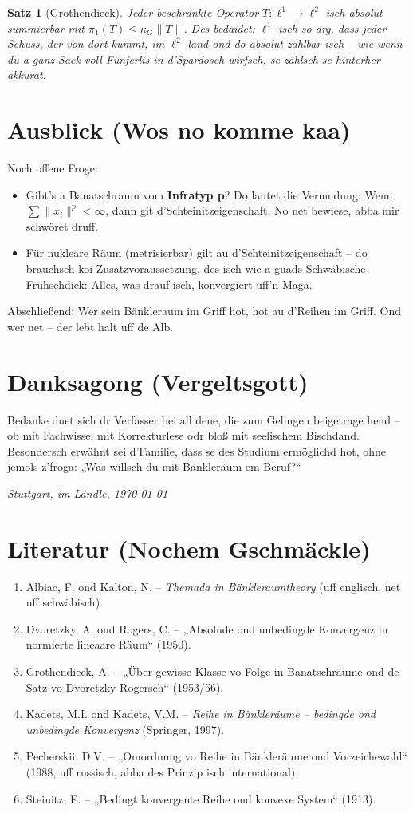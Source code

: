 \documentclass[12pt,a4paper]{scrbook}
\newtheorem{theorem}{Satz}[chapter]
\begin{document}
	\begin{theorem}[Grothendieck]
		Jeder beschränkte Operator \(T: \ell^1 \to \ell^2\) isch absolut summierbar mit \(\pi_1(T) \le \kappa_G \|T\|\). Des bedaidet: \(\ell^1\) isch so arg, dass jeder Schuss, der von dort kummt, im \(\ell^2\) land ond do absolut zählbar isch – wie wenn du a ganz Sack voll Fünferlis in d’Spardosch wirfsch, se zählsch se hinterher akkurat.
	\end{theorem}
	
	\chapter{Ausblick (Wos no komme kaa)}
	Noch offene Froge:
	\begin{itemize}
		\item Gibt’s a Banatschraum vom \textbf{Infratyp p}? Do lautet die Vermudung: Wenn \(\sum\|x_i\|^p < \infty\), dann git d’Schteinitzeigenschaft. No net bewiese, abba mir schwöret druff.
		\item Für nukleare Räum (metrisierbar) gilt au d’Schteinitzeigenschaft – do brauchsch koi Zusatzvoraussetzung, des isch wie a guads Schwäbische Frühschdick: Alles, was drauf isch, konvergiert uff’n Maga.
	\end{itemize}
	Abschließend: Wer sein Bänkleraum im Griff hot, hot au d’Reihen im Griff. Ond wer net – der lebt halt uff de Alb.
	
	\chapter*{Danksagong (Vergeltsgott)}
	Bedanke duet sich dr Verfasser bei all dene, die zum Gelingen beigetrage hend – ob mit Fachwisse, mit Korrekturlese odr bloß mit seelischem Bischdand. Besondersch erwähnt sei d’Familie, dass se des Studium ermöglichd hot, ohne jemols z’froga: „Was willsch du mit Bänkleräum em Beruf?“ 
	
	\medskip
	\textit{Stuttgart, im Ländle, \today}
	
	\chapter*{Literatur (Nochem Gschmäckle)}
	\begin{enumerate}
		\item Albiac, F. ond Kalton, N. – \textit{Themada in Bänkleraumtheory} (uff englisch, net uff schwäbisch).
		\item Dvoretzky, A. ond Rogers, C. – „Absolude ond unbedingde Konvergenz in normierte lineaare Räum“ (1950).
		\item Grothendieck, A. – „Über gewisse Klasse vo Folge in Banatschräume ond de Satz vo Dvoretzky-Rogersch“ (1953/56).
		\item Kadets, M.I. ond Kadets, V.M. – \textit{Reihe in Bänkleräume – bedingde ond unbedingde Konvergenz} (Springer, 1997).
		\item Pecherskii, D.V. – „Omordnung vo Reihe in Bänkleräume ond Vorzeichewahl“ (1988, uff russisch, abba des Prinzip isch international).
		\item Steinitz, E. – „Bedingt konvergente Reihe ond konvexe System“ (1913).
	\end{enumerate}
	
\end{document}
